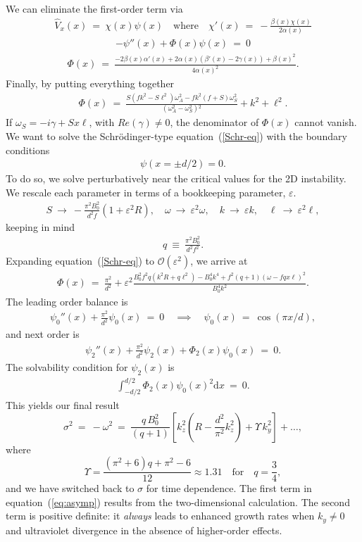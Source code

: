 \documentclass[openacc]{rsproca_new}%
\newcommand\Beq{\begin{eqnarray}}
\newcommand\Eeq{\end{eqnarray}}
\newcommand{\eps}{\varepsilon}
\begin{document}
We can eliminate the first-order term via
\Beq
\hat{V}_{x}(x) \ = \ \chi(x) \psi(x) \quad \text{where} \quad \chi'(x) \  = \ -\frac{\beta (x) \chi (x)}{2 \alpha (x)}
\Eeq
\Beq
-\psi''(x) + \Phi(x) \psi(x) \ = \ 0 \label{Schr-eq}
\Eeq
\Beq
\Phi(x)  \ = \ \frac{-2 \beta (x) \alpha '(x)+2 \alpha (x)
   \left(\beta '(x)-2 \gamma (x)\right)+\beta
   (x)^2}{4 \alpha (x)^2}.
\Eeq
Finally, by putting everything together 
\Beq
\Phi(x) \ = \ \frac{S  \left(f k^2-S \ell
   ^2\right) \omega _A^2 -f k^2 (f+S) \omega
   _S^2}{\left(\omega _A^2-\omega
   _S^2\right){}^2} + k^{2} + \ell^{2}.
\Eeq
If $\omega_{S}=-i \gamma+Sx\ell$, with $Re(\gamma)\neq0$, the denominator of $\Phi(x)$ cannot vanish. 
We want to solve the Schr\"{o}dinger-type equation~(\ref{Schr-eq}) with the boundary conditions 
\Beq
\psi(x=\pm d/2) = 0.
\Eeq
To do so, we solve perturbatively near the critical values for the 2D instability. We rescale each parameter in terms of a bookkeeping parameter, $\eps$.
\Beq
S  \ \to \  - \frac{\pi ^2 B_{0}^2}{d^2 f} ( 1 + \eps^{2} R), \quad \omega \ \to \ \eps^{2} \omega , \quad k \ \to \ \eps k, \quad \ell \ \to \ \eps^{2} \ell,
\Eeq 
keeping in mind
\Beq
q  \ \equiv  \ \frac{\pi ^2 B_{0}^2}{d^2 f^{2}}.
\Eeq
Expanding equation~(\ref{Schr-eq}) to $\mathcal{O}(\eps^{2})$, we arrive at
\Beq
\Phi(x) \ = \ \frac{\pi^{2}}{d^{2}} + \eps^{2} \frac{B_{0}^2 f^2 q \left(k^2 R+q
   \ell ^2\right) - B_{0}^4 k^4 +f^2 (q+1) (\omega -f q x \ell
   )^2  }{B_{0}^4 k^2}.
\Eeq
The leading order balance is
\Beq
\psi_{0}''(x) + \frac{\pi^{2}}{d^{2}}  \psi_{0}(x) \ = \ 0  \quad \implies \quad \psi_{0}(x) \ = \ \cos(\pi x / d),
\Eeq
and next order is
\Beq
\psi_{2}''(x) + \frac{\pi^{2}}{d^{2}}  \psi_{2}(x) + \Phi_{2}(x)\psi_{0}(x)\ = \ 0.
\Eeq
The solvability condition for $\psi_{2}(x)$ is 
\Beq
\int_{-d/2}^{d/2} \Phi_{2}(x)\psi_{0}(x)^{2} \text{d} x \ = \ 0.
\Eeq
This yields our final result
\begin{equation}\label{eq:asymp}
\sigma^{2}\ = \ - \omega^{2} \ = \  \frac{q\,B_{0}^{2}}{(q+1)}\left[ k_{z}^{2}\left(R-\frac{d^2}{\pi^{2}}k_{z}^{2}\right)+\Upsilon\,k_{y}^{2}\right]+\ldots,
\end{equation}
where
\begin{equation}
\Upsilon=\frac{\left(\pi^{2}+6\right) q+\pi^{2}-6}{12}\approx1.31\quad\text{for}\quad{q}=\frac{3}{4},
\end{equation}
and we have switched back to $\sigma$ for time dependence.
The first term in equation~(\ref{eq:asymp}) results from the two-dimensional calculation.
The second term is positive definite: it \emph{always} leads to enhanced growth rates when $k_{y}\neq0$ and ultraviolet divergence in the absence of higher-order effects.
\end{document}
